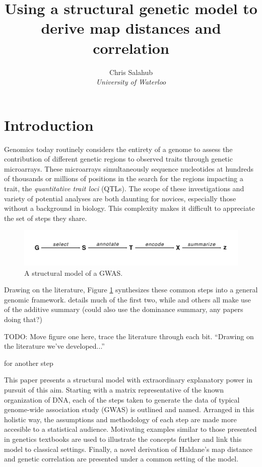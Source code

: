 \documentclass{article}
\title{Using a structural genetic model to derive map distances and correlation}
\author{Chris Salahub \\
	\textit{University of Waterloo}}
\newcommand{\TODO}[1]{{\color{brickred} TODO:  {#1}}}
\begin{document}
	
\maketitle

\section{Introduction} \label{sec:intro}


Genomics today routinely considers the entirety of a genome to assess the contribution of different genetic regions to observed traits through genetic microarrays. These microarrays simultaneously sequence nucleotides at hundreds of thousands or millions of positions in the search for the regions impacting a trait, the \emph{quantitative trait loci} (QTLs). The scope of these investigations and variety of potential analyses are both daunting for novices, especially those without a background in biology. This complexity makes it difficult to appreciate the set of steps they share.

\begin{figure}[!ht]
  \begin{center}
  \includegraphics[scale = 1]{./img/modelDiagram.pdf}
  \caption{A structural model of a GWAS.}
  \label{fig:modelDiagram}
\end{center}
\end{figure}

Drawing on the literature, Figure \ref{fig:modelDiagram} synthesizes these common steps into a general genomic framework. \cite{laframboise2009} details much of the first two, while \cite{cheverud2001, Galwey2009} and others all make use of the additive summary (could also use the dominance summary, any papers doing that?)

\TODO{Move figure one here, trace the literature through each bit. ``Drawing on the literature we've developed...''}

\cite{LanderBotstein1989} for another step

This paper presents a structural model with extraordinary explanatory power in pursuit of this aim. Starting with a matrix representative of the known organization of DNA, each of the steps taken to generate the data of typical genome-wide association study (GWAS) is outlined and named. Arranged in this holistic way, the assumptions and methodology of each step are made more accesible to a statistical audience. Motivating examples similar to those presented in genetics textbooks are used to illustrate the concepts further and link this model to classical settings. Finally, a novel derivation of Haldane's map distance and genetic correlation are presented under a common setting of the model.
\end{document}
